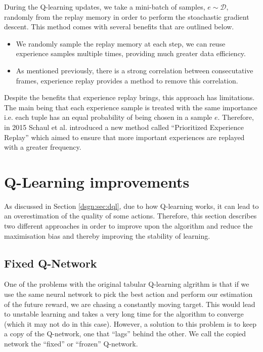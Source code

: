 During the Q-learning updates, we take a mini-batch of samples, $e \sim \mathcal{D}$, randomly from the replay memory in order to perform the stoachastic gradient descent. This method comes with several benefits that are outlined below.

\begin{itemize}
	\item We randomly sample the replay memory at each step, we can reuse experience samples multiple times, providing much greater data efficiency.
	\item As mentioned previously, there is a strong correlation between consecutative frames, experience replay provides a method to remove this correlation.
\end{itemize}

Despite the benefits that experience replay brings, this approach has limitations. The main being that each experience sample is treated with the same importance i.e. each tuple has an equal probability of being chosen in a sample $e$. Therefore, in 2015 Schaul et al. \cite{per} introduced a new method called ``Prioritized Experience Replay'' which aimed to ensure that more important experiences are replayed with a greater frequency.

\section{Q-Learning improvements}
\label{dsgn:sec:qlearning:qextra}
As discussed in Section \ref{dsgn:sec:dql}, due to how Q-learning works, it can lead to an overestimation of the quality of some actions. Therefore, this section describes two different approaches in order to improve upon the algorithm and reduce the maximisation bias and thereby improving the stability of learning.

\subsection{Fixed Q-Network}
\label{dsgn:sec:qlearning:fixed}
One of the problems with the original tabular Q-learning algrithm is that if we use the same neural network to pick the best action and perform our estimation of the future reward, we are chasing a constantly moving target. This would lead to unstable learning and takes a very long time for the algorithm to converge (which it may not do in this case). However, a solution to this problem is to keep a copy of the Q-network, one that ``lags'' behind the other. We call the copied network the ``fixed'' or ``frozen'' Q-network.

